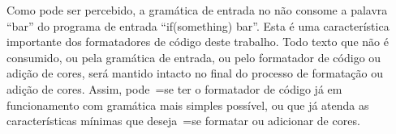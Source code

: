 Como pode ser percebido,
a gramática de entrada no  não consome a palavra ``bar'' do programa de entrada ``if(something) bar''.
Esta é uma característica importante dos formatadores de código deste trabalho.
Todo texto que não é consumido,
ou pela gramática de entrada,
ou pelo formatador de código ou
adição de cores,
será mantido intacto no final do processo de formatação ou
adição de cores.
Assim,
pode~=se ter o formatador de código já em funcionamento com gramática mais simples possível,
ou que já atenda as características mínimas que deseja~=se formatar ou
adicionar de cores.
